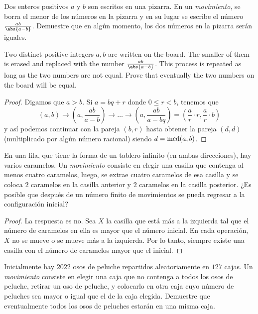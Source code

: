 
\begin{probEG}
	Dos enteros positivos $a$ y $b$ son escritos en una pizarra. En un \emph{movimiento}, se borra el menor de los números en la pizarra y en su lugar se escribe el número $\frac{ab}{\abs{a-b}}$. Demuestre que en algún momento, los dos números en la pizarra serán iguales.
	\begin{hint}
		Two distinct positive integers $a,b$ are written on the board. The smaller of them is erased and replaced with the number $\frac{ab}{\abs{a-b}}$. This process is repeated as long as the two numbers are not equal. Prove that eventually the two numbers on the board will be equal.
	\end{hint}
\end{probEG}

\begin{proof}
	Digamos que $a>b$. Si $a=bq+r$ donde $0\le r<b$, tenemos que
	\[(a,b)\to\left(a,\frac{ab}{a-b}\right)\to\dots\to\left(a,\frac{ab}{a-bq}\right)=\left(\frac{a}{r}\cdot r,\frac{a}{r}\cdot b\right)\]
	y así podemos continuar con la pareja $(b,r)$ hasta obtener la pareja $(d,d)$ (multiplicado por algún número racional) siendo $d=\operatorname{mcd}(a,b)$.
\end{proof}

\begin{probEG}
	En una fila, que tiene la forma de un tablero infinito (en ambas direcciones), hay varios caramelos. Un \emph{movimiento} consiste en elegir una casilla que contenga al menos cuatro caramelos, luego, se extrae cuatro caramelos de esa casilla y se coloca $2$ caramelos en la casilla anterior y $2$ caramelos en la casilla posterior. ¿Es posible que después de un número finito de movimientos se pueda regresar a la configuración inicial?
\end{probEG}

\begin{proof}
	La respuesta es no. Sea $X$ la casilla que está más a la izquierda tal que el número de caramelos en ella es mayor que el número inicial. En cada operación, $X$ no se mueve o se mueve más a la izquierda. Por lo tanto, siempre existe una casilla con el número de caramelos mayor que el inicial.
\end{proof}

\begin{probEG}
	Inicialmente hay $2022$ osos de peluche repartidos aleatoriamente en $127$ cajas. Un \emph{movimiento} consiste en elegir una caja que no contenga a todos los osos de peluche, retirar un oso de peluche, y colocarlo en otra caja cuyo número de peluches sea mayor o igual que el de la caja elegida. Demuestre que eventualmente todos los osos de peluches estarán en una misma caja.
\end{probEG}


